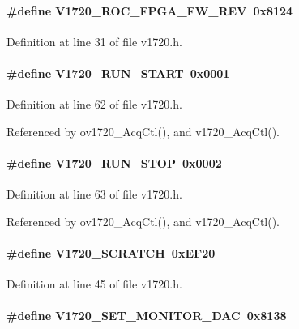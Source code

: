 \paragraph[{V1720\_\-ROC\_\-FPGA\_\-FW\_\-REV}]{\setlength{\rightskip}{0pt plus 5cm}\#define V1720\_\-ROC\_\-FPGA\_\-FW\_\-REV~0x8124}\hfill\label{v1720_8h_a98d6da17e430caaebc6a1f5e41c83077}


Definition at line 31 of file v1720.h.
\paragraph[{V1720\_\-RUN\_\-START}]{\setlength{\rightskip}{0pt plus 5cm}\#define V1720\_\-RUN\_\-START~0x0001}\hfill\label{v1720_8h_aedf6743df97a50bdd812bac10b554c25}


Definition at line 62 of file v1720.h.

Referenced by ov1720\_\-AcqCtl(), and v1720\_\-AcqCtl().
\paragraph[{V1720\_\-RUN\_\-STOP}]{\setlength{\rightskip}{0pt plus 5cm}\#define V1720\_\-RUN\_\-STOP~0x0002}\hfill\label{v1720_8h_aca8deec5ed5174499baf1bac2156c5b6}


Definition at line 63 of file v1720.h.

Referenced by ov1720\_\-AcqCtl(), and v1720\_\-AcqCtl().
\paragraph[{V1720\_\-SCRATCH}]{\setlength{\rightskip}{0pt plus 5cm}\#define V1720\_\-SCRATCH~0xEF20}\hfill\label{v1720_8h_a1fbe09cba6063c87ad1e4d98a331aa21}


Definition at line 45 of file v1720.h.
\paragraph[{V1720\_\-SET\_\-MONITOR\_\-DAC}]{\setlength{\rightskip}{0pt plus 5cm}\#define V1720\_\-SET\_\-MONITOR\_\-DAC~0x8138}\hfill\label{v1720_8h_ad5b8f4442956341db8863a250239fca7}



